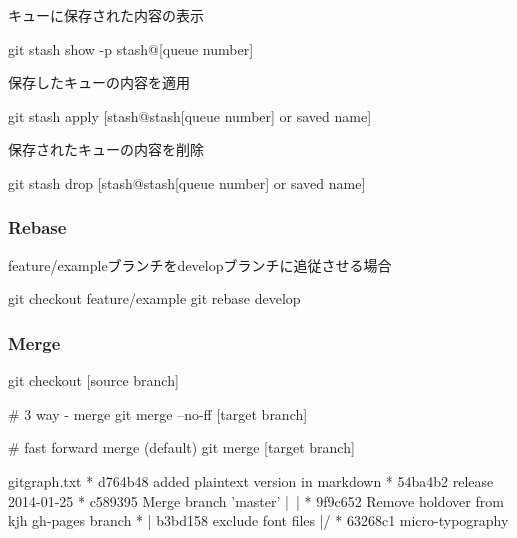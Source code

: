 \documentclass[10pt,a4j,openany,dvipdfmx]{jsarticle}
\begin{document}
キューに保存された内容の表示
\begin{commandshell}
git stash show -p stash@{[queue number]}
\end{commandshell}

保存したキューの内容を適用
\begin{commandshell}
git stash apply [stash@{stash[queue number]} or saved name]
\end{commandshell}

保存されたキューの内容を削除
\begin{commandshell}
git stash drop [stash@{stash[queue number]} or saved name]
\end{commandshell}

\subsubsection{Rebase} %
\label{ssub:rebase}

feature/exampleブランチをdevelopブランチに追従させる場合
\begin{commandshell}
git checkout feature/example
git rebase develop 
\end{commandshell}

\subsubsection{Merge} %
\label{ssub:merge}

\begin{commandshell}
git checkout [source branch]

# 3 way - merge
git merge --no-ff [target branch]

# fast forward merge (default)
git merge [target branch]
\end{commandshell}


\begin{filecontents}{gitgraph.txt}
* d764b48 added plaintext version in markdown
* 54ba4b2 release 2014-01-25
*   c589395 Merge branch 'master'
|\
| * 9f9c652 Remove holdover from kjh gh-pages branch
* | b3bd158 exclude font files
|/
* 63268c1 micro-typography
\end{filecontents}
\end{document}

